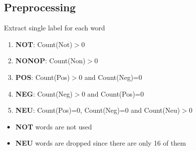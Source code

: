 \documentclass[compress]{beamer}
\begin{document}
    \subsection{Preprocessing}
        \begin{frame}{\subsecname}
            \begin{block}{Extract single label for each word}
                \begin{enumerate}
                    \item \textbf{NOT}: Count(Not)$>$0
                    \item \textbf{NONOP}: Count(Non)$>$0
                    \item \textbf{POS}: Count(Pos)$>$0 and Count(Neg)=0
                    \item \textbf{NEG}: Count(Neg)$>$0 and Count(Pos)=0
                    \item \textbf{NEU}: Count(Pos)=0, Count(Neg)=0 and Count(Neu)$>$0
                \end{enumerate}
            \end{block}
            \pause
            \begin{itemize}
                \item \textbf{NOT} words are not used
                \item \textbf{NEU} words are dropped since there are only 16 of them
            \end{itemize}
        \end{frame}
\end{document}
